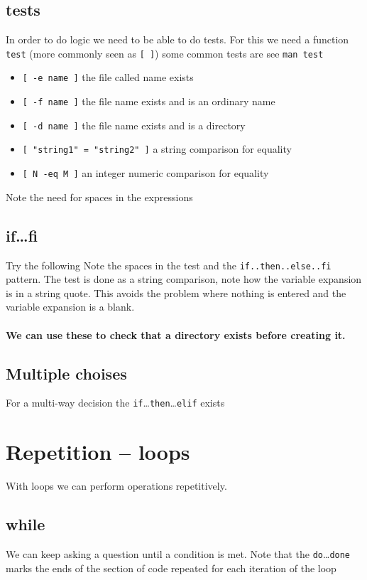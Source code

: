 \documentclass[a4paper]{article}
\begin{document}
\subsection{tests}
In order to do logic we need to be able to do tests.  For this we need
a function \texttt{test} (more commonly seen as \texttt{[ ]}) some
common tests are see \texttt{man test}
\begin{itemize}
\item \verb*:[ -e name ]: the file called name exists
\item \verb*:[ -f name ]: the file name exists and is an ordinary name
\item \verb*:[ -d name ]: the file name exists and is a directory
\item \verb*:[ "string1" = "string2" ]: a string comparison for equality
\item \verb*:[ N -eq M ]: an integer numeric comparison for equality
\end{itemize}
Note the need for spaces in the expressions

\subsection{if\ldots fi}
Try the following
Note the spaces in the test and the \texttt{if..then..else..fi}
pattern.  The test is done as a string comparison, note how the
variable expansion is in a string quote.  This avoids the problem
where nothing is entered and the variable expansion is a blank.

\paragraph{We can use these to check that a directory exists before creating it.}

\subsection{Multiple choises}
For a multi-way decision the
\texttt{if}\ldots\texttt{then}\ldots\texttt{elif} exists


\section{Repetition -- loops}
With loops we can perform operations repetitively.

\subsection{while}
We can keep asking a question until a condition is met.
Note that the \texttt{do}\ldots\texttt{done} marks the ends of the
section of code repeated for each iteration of the loop
\end{document}
